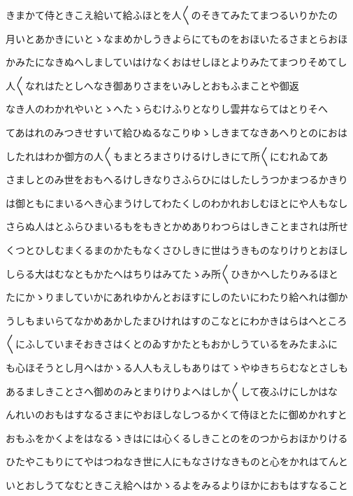 \documentclass[a4paper,11pt,landscape]{ltjtarticle}
\begin{document}
\par\medskip
きまかて侍ときこえ給いて給ふほとを人〱のそきてみたてまつるいりかたの
\par\medskip
月いとあかきにいとゝなまめかしうきよらにてものをおほいたるさまとらおほ
\par\medskip
かみたになきぬへしましていはけなくおはせしほとよりみたてまつりそめてし
\par\medskip
人〱なれはたとしへなき御ありさまをいみしとおもふまことや御返
\par\medskip
なき人のわかれやいとゝへたゝらむけふりとなりし雲井ならてはとりそへ
\par\medskip
てあはれのみつきせすいて給ひぬるなこりゆゝしきまてなきあへりとのにおは
\par\medskip
したれはわか御方の人〱もまとろまさりけるけしきにて所〱にむれゐてあ
\par\medskip
さましとのみ世をおもへるけしきなりさふらひにはしたしうつかまつるかきり
\par\medskip
は御ともにまいるへき心まうけしてわたくしのわかれおしむほとにや人もなし
\par\medskip
さらぬ人はとふらひまいるもをもきとかめありわつらはしきことまされは所せ
\par\medskip
くつとひしむまくるまのかたもなくさひしきに世はうきものなりけりとおほし
\par\medskip
しらる大はむなともかたへはちりはみてたゝみ所〱ひきかへしたりみるほと
\par\medskip
たにかゝりましていかにあれゆかんとおほすにしのたいにわたり給へれは御か
\par\medskip
うしもまいらてなかめあかしたまひけれはすのこなとにわかきはらはへところ
\par\medskip
〱にふしていまそおきさはくとのゐすかたともおかしうているをみたまふに
\par\medskip
も心ほそうとし月へはかゝる人人もえしもありはてゝやゆきちらむなとさしも
\par\medskip
あるましきことさへ御めのみとまりけりよへはしか〱して夜ふけにしかはな
\par\medskip
んれいのおもはすなるさまにやおほしなしつるかくて侍ほとたに御めかれすと
\par\medskip
おもふをかくよをはなるゝきはには心くるしきことのをのつからおほかりける
\par\medskip
ひたやこもりにてやはつねなき世に人にもなさけなきものと心をかれはてんと
\par\medskip
いとおしうてなむときこえ給へはかゝるよをみるよりほかにおもはすなること
\par\medskip
\end{document}
